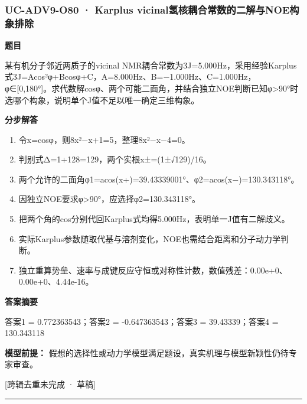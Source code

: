 \documentclass[UTF8,11pt,a4paper]{ctexart}
\begin{document}
\subsubsection*{UC-ADV9-O80 · Karplus vicinal氢核耦合常数的二解与NOE构象排除}
\noindent\textbf{题目}\par
某有机分子邻近两质子的vicinal NMR耦合常数为3J=5.000Hz，采用经验Karplus式3J=Acos²φ+Bcosφ+C，A=8.000Hz、B=−1.000Hz、C=1.000Hz，φ∈[0,180°]。求代数解cosφ、两个可能二面角，并结合独立NOE判断已知φ>90°时选哪个构象，说明单个J值不足以唯一确定三维构象。\par
\medskip\noindent\textbf{分步解答}
\begin{enumerate}
\item 令x=cosφ，则8x²−x+1=5，整理8x²−x−4=0。
\item 判别式Δ=1+128=129，两个实根x±=(1±√129)/16。
\item 两个允许的二面角φ1=acos(x+)=39.43339001°、φ2=acos(x−)=130.343118°。
\item 因独立NOE要求φ>90°，应选择φ2=130.343118°。
\item 把两个角的cos分别代回Karplus式均得5.000Hz，表明单一J值有二解歧义。
\item 实际Karplus参数随取代基与溶剂变化，NOE也需结合距离和分子动力学判断。
\item 独立重算势垒、速率与成键反应守恒或对称性计数，数值残差：0.00e+0、0.00e+0、4.44e-16。
\end{enumerate}
\noindent\textbf{答案摘要}\par
答案1 = 0.772363543；答案2 = -0.647363543；答案3 = 39.43339；答案4 = 130.343118\par
\noindent\textbf{模型前提：}
假想的选择性或动力学模型满足题设，真实机理与模型新颖性仍待专家审查。\par
\noindent\textcolor{red!65!black}{[跨辑去重未完成 · 草稿]} \par
\medskip\hrule\medskip
{}
\end{document}
